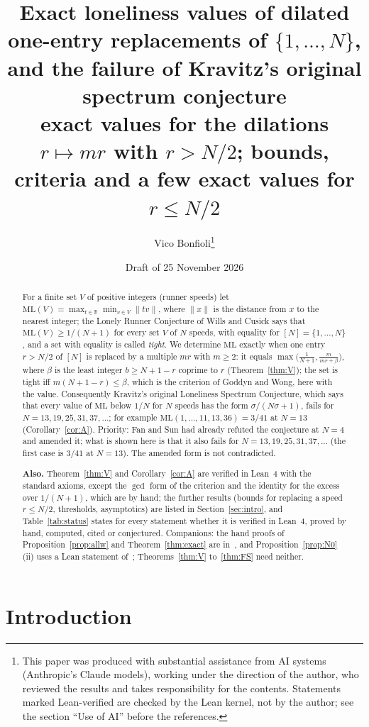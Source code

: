\documentclass[11pt]{article}
\title{Exact loneliness values of dilated one-entry replacements of $\{1,\dots,N\}$, and the failure of Kravitz's original spectrum conjecture\\[2pt]\large exact values for the dilations $r\mapsto mr$ with $r>N/2$; bounds, criteria and a few exact values for $r\le N/2$}
\author{Vico Bonfioli\thanks{This paper was produced with substantial assistance from AI systems (Anthropic's Claude models), working under the direction of the author, who reviewed the results and takes responsibility for the contents. Statements marked Lean-verified are checked by the Lean kernel, not by the author; see the section ``Use of AI'' before the references.}}
\date{Draft of 25 November 2026}
\theoremstyle{definition}
\theoremstyle{remark}
\newcommand{\nd}[1]{\lVert #1\rVert}
\newcommand{\ML}{\mathrm{ML}}
\newcommand{\RR}{\mathbb{R}}
\begin{document}
\maketitle

\begin{abstract}
\noindent For a finite set $V$ of positive integers (runner speeds) let $\ML(V)=\max_{t\in\RR}\min_{v\in V}\nd{tv}$, where $\nd{x}$ is the distance from $x$ to the nearest integer; the Lonely Runner Conjecture of Wills and Cusick says that $\ML(V)\ge1/(N+1)$ for every set $V$ of $N$ speeds, with equality for $[N]=\{1,\dots,N\}$, and a set with equality is called \emph{tight}.
We determine $\ML$ exactly when one entry $r>N/2$ of $[N]$ is replaced by a multiple $mr$ with $m\ge2$: it equals $\max\bigl(\frac1{N+1},\frac m{mr+\beta}\bigr)$, where $\beta$ is the least integer $b\ge N+1-r$ coprime to $r$ (Theorem~\ref{thm:V}); the set is tight iff $m(N+1-r)\le\beta$, which is the criterion of Goddyn and Wong, here with the value.
Consequently Kravitz's original Loneliness Spectrum Conjecture, which says that every value of $\ML$ below $1/N$ for $N$ speeds has the form $\sigma/(N\sigma+1)$, fails for $N=13,19,25,31,37,\dots$; for example $\ML(1,\dots,11,13,36)=3/41$ at $N=13$ (Corollary~\ref{cor:A}). Priority: Fan and Sun had already refuted the conjecture at $N=4$ and amended it; what is shown here is that it also fails for $N=13,19,25,31,37,\dots$ (the first case is $3/41$ at $N=13$). The amended form is not contradicted.

\medskip\noindent\textbf{Also.} Theorem~\ref{thm:V} and Corollary~\ref{cor:A} are verified in Lean~4 with the standard axioms, except the $\gcd$ form of the criterion and the identity for the excess over $1/(N+1)$, which are by hand; the further results (bounds for replacing a speed $r\le N/2$, thresholds, asymptotics) are listed in Section~\ref{sec:intro}, and Table~\ref{tab:status} states for every statement whether it is verified in Lean~4, proved by hand, computed, cited or conjectured. Companions: the hand proofs of Proposition~\ref{prop:allw} and Theorem~\ref{thm:exact} are in~\cite{A2}, and Proposition~\ref{prop:N0}(ii) uses a Lean statement of~\cite{B}; Theorems~\ref{thm:V} to~\ref{thm:FS} need neither.
\end{abstract}

\section{Introduction}\label{sec:intro}
\end{document}
